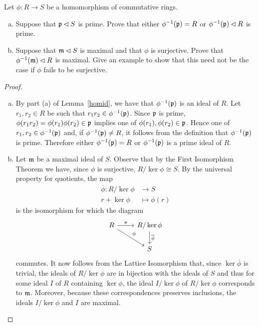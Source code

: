 \documentclass[10pt]{amsart}
\begin{document}
\begin{thm}
  Let $\phi \colon R \rightarrow S$ be a homomorphism of commutative rings.
  \begin{enumerate}[(a)]
  \item
    Suppose that $\mathfrak{p} \lhd S$ is prime.
    Prove that either $\phi^{-1}(\mathfrak{p}) = R$ or $\phi^{-1}(\mathfrak{p}) \lhd R$ is prime.
  \item
    Suppose that $\mathfrak{m} \lhd S$ is maximal and that $\phi$ is surjective.
    Prove that $\phi^{-1}(\mathfrak{m}) \lhd R$ is maximal.
    Give an example to show that this need not be the case if $\phi$ fails to be surjective.
  \end{enumerate}
  \begin{proof}
    \begin{enumerate}[(a)]
    \item
      By part (a) of Lemma~\ref{homid}, we have that $\phi^{-1}(\mathfrak{p})$ is an ideal of $R$.
      Let $r_1, r_2 \in R$ be such that $r_1r_2 \in \phi^{-1}(\mathfrak{p})$.
      Since $\mathfrak{p}$ is prime, $\phi(r_1r_2) = \phi(r_1)\phi(r_2) \in \mathfrak{p}$ implies one of $\phi(r_1), \phi(r_2) \in \mathfrak{p}$.
      Hence one of $r_1, r_2 \in \phi^{-1}(\mathfrak{p})$ and, if $\phi^{-1}(\mathfrak{p}) \neq R$, it follows from the definition that $\phi^{-1}(\mathfrak{p})$ is prime.
      Therefore either $\phi^{-1}(\mathfrak{p}) = R$ or $\phi^{-1}(\mathfrak{p})$ is a prime ideal of $R$.
    \item
      Let $\mathfrak{m}$ be a maximal ideal of $S$.
      Observe that by the First Isomorphism Theorem we have, since $\phi$ is surjective, $R/\ker \phi \cong S$.
      By the universal property for quotients, the map 
      \begin{align*}
        \overline{\phi} \colon R/\ker\phi &\rightarrow S\\
        r + \ker\phi & \mapsto \phi(r)
      \end{align*}
      is the isomorphism for which the diagram 
      \begin{equation}\label{diagram}
        \begin{tikzcd}
          R \arrow{r}{\pi} \arrow{rd}{\phi} &R/\ker\phi \arrow{d}{\overline{\phi}}\\
          &S
        \end{tikzcd}
      \end{equation}
      commutes.
      It now follows from the Lattice Isomorphism that, since $\ker\overline{\phi}$ is trivial, the ideals of $R/\ker\phi$ are in bijection with the ideals of $S$ and thus for some ideal $I$ of $R$ containing $\ker\phi$, the ideal $I/\ker\phi$ of $R/\ker\phi$ corresponds to $\mathfrak{m}$.
      Moreover, because these correspondences preserves inclusions, the ideals $I/\ker\phi$ and $I$ are maximal.


\end{enumerate}
\end{proof}
\end{thm}
\end{document}
